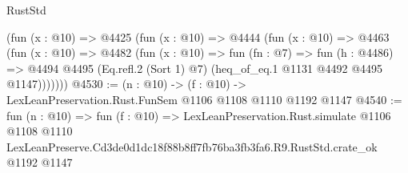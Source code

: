\begin{lexlean}{RustStd}
\begin{coremodule}
      (fun (x : @10) =>
      @4425
        (fun (x : @10) =>
        @4444
          (fun (x : @10) =>
          @4463
            (fun (x : @10) =>
            @4482
              (fun (x : @10) =>
              fun (fn : @7) =>
              fun (h : @4486) =>
              @4494 @4495 (Eq.refl.{2} (Sort 1) @7) (heq_of_eq.{1} @1131 @4492 @4495 @1147)))))))
@4530 := (n : @10) -> (f : @10) -> LexLeanPreservation.Rust.FunSem @1106 @1108 @1110 @1192 @1147
@4540 := fun (n : @10) =>
  fun (f : @10) =>
  LexLeanPreservation.Rust.simulate
    @1106
    @1108
    @1110
    LexLeanPreserve.Cd3de0d1dc18f88b8ff7fb76ba3fb3fa6.R9.RustStd.crate_ok
    @1192
    @1147
\end{coremodule}
\end{lexlean}
